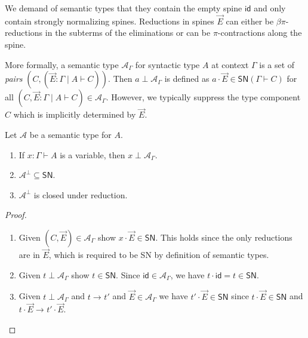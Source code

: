 \documentclass[a4paper,USenglish,cleveref, autoref, thm-restate]{lipics-v2019}
\newcommand{\bla}{\ensuremath{\mbox{$$}}}
\newcommand{\tid}{\mathsf{id}}
\newcommand{\ru}{\dfrac}
\newcommand{\red}[1][]{\longrightarrow_{#1}}
\newcommand{\A}{\mathcal{A}}
\newcommand{\SN}{\mathsf{SN}}
\begin{document}

We demand of semantic types that they contain the
empty spine $\tid$
and only contain strongly normalizing
spines.
Reductions \fbox{$\vec E \red \vec E'$} in spines $\vec E$ can either be
$\beta\pi$-reductions in the subterms of the eliminations or can be
$\pi$-contractions along the spine.

More formally, a semantic type $\A_\Gamma$ for syntactic type $A$ at
context $\Gamma$ is a set of \emph{pairs}
$(C, (\vec E : \Gamma \mid A \vdash C))$.
Then $a \perp \A_\Gamma$ is defined as
$a \cdot \vec E \in \SN(\Gamma \vdash C)$
for all $(C, \vec E : \Gamma \mid A \vdash C) \in \A_\Gamma$.
However, we typically
suppress the type component $C$ which is implicitly determined by
$\vec E$.
\begin{lemma}
  Let $\A$ be a semantic type for $A$.
  \begin{enumerate}
  \item If $x : \Gamma \vdash A$ is a variable, then $x \perp
    \A_\Gamma$.
  \item $\A^\perp \subseteq \SN$.
  \item $\A^\perp$ is closed under reduction.
  \end{enumerate}
\end{lemma}
\begin{proof} \bla
  \begin{enumerate}
  \item Given $(C, \vec E) \in \A_\Gamma$ show $x \cdot \vec E \in
    \SN$.  This holds since the only reductions are in $\vec E$, which
    is required to be SN by definition of semantic types.

  \item Given $t \perp \A_\Gamma$ show $t \in \SN$.
   Since $\tid \in \A_\Gamma$, we have $t \cdot \tid = t \in \SN$.

  \item Given $t \perp \A_\Gamma$ and $t \red t'$ and $\vec E \in \A_\Gamma$ we
    have $t' \cdot \vec E \in \SN$ since $t \cdot \vec E \in \SN$ and
    $t \cdot \vec E \red t' \cdot \vec E$.
  \popQED
  \end{enumerate}
\end{proof}
\end{document}
